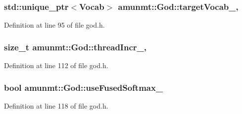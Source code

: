 \subsubsection[{\texorpdfstring{target\+Vocab\+\_\+}{targetVocab_}}]{\setlength{\rightskip}{0pt plus 5cm}std\+::unique\+\_\+ptr$<${\bf Vocab}$>$ amunmt\+::\+God\+::target\+Vocab\+\_\+\hspace{0.3cm}{\ttfamily [mutable]}, {\ttfamily [private]}}\hypertarget{classamunmt_1_1God_a38957553a6fc282c0487c4d2d9a02f90}{}\label{classamunmt_1_1God_a38957553a6fc282c0487c4d2d9a02f90}


Definition at line 95 of file god.\+h.

\subsubsection[{\texorpdfstring{thread\+Incr\+\_\+}{threadIncr_}}]{\setlength{\rightskip}{0pt plus 5cm}size\+\_\+t amunmt\+::\+God\+::thread\+Incr\+\_\+\hspace{0.3cm}{\ttfamily [mutable]}, {\ttfamily [private]}}\hypertarget{classamunmt_1_1God_a900c7443532f035640b4ff064899b50e}{}\label{classamunmt_1_1God_a900c7443532f035640b4ff064899b50e}


Definition at line 112 of file god.\+h.

\subsubsection[{\texorpdfstring{use\+Fused\+Softmax\+\_\+}{useFusedSoftmax_}}]{\setlength{\rightskip}{0pt plus 5cm}bool amunmt\+::\+God\+::use\+Fused\+Softmax\+\_\+\hspace{0.3cm}{\ttfamily [private]}}\hypertarget{classamunmt_1_1God_a2ea1b8cdaf00c9a882945ba8238f99ea}{}\label{classamunmt_1_1God_a2ea1b8cdaf00c9a882945ba8238f99ea}


Definition at line 118 of file god.\+h.

